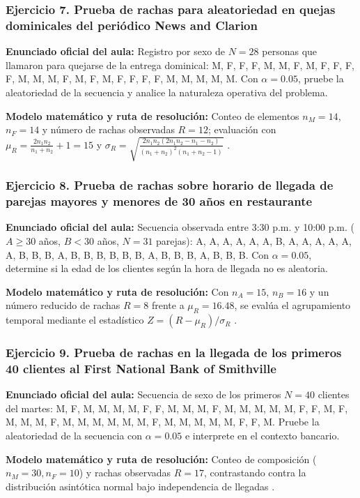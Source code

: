 {\subsubsection*{Ejercicio 7. Prueba de rachas para aleatoriedad en quejas dominicales del periódico News and Clarion}
\textbf{Enunciado oficial del aula:} Registro por sexo de $N = 28$ personas que llamaron para quejarse de la entrega dominical: M, F, F, F, M, M, F, M, F, F, F, F, M, M, M, F, M, F, M, F, F, F, F, M, M, M, M, M. Con $\alpha = 0.05$, pruebe la aleatoriedad de la secuencia y analice la naturaleza operativa del problema.

\textbf{Modelo matemático y ruta de resolución:} Conteo de elementos $n_M = 14$, $n_F = 14$ y número de rachas observadas $R = 12$; evaluación con $\mu_R = \frac{2 n_1 n_2}{n_1 + n_2} + 1 = 15$ y $\sigma_R = \sqrt{\frac{2n_1 n_2(2n_1 n_2 - n_1 - n_2)}{(n_1+n_2)^2(n_1+n_2-1)}}$ \citep{levin2004}.

\subsubsection*{Ejercicio 8. Prueba de rachas sobre horario de llegada de parejas mayores y menores de 30 años en restaurante}
\textbf{Enunciado oficial del aula:} Secuencia observada entre 3:30 p.m. y 10:00 p.m. ($A \ge 30$ años, $B < 30$ años, $N = 31$ parejas): A, A, A, A, A, A, B, A, A, A, A, A, A, B, B, B, A, B, B, B, B, B, B, A, B, B, B, A, B, B, B. Con $\alpha = 0.05$, determine si la edad de los clientes según la hora de llegada no es aleatoria.

\textbf{Modelo matemático y ruta de resolución:} Con $n_A = 15$, $n_B = 16$ y un número reducido de rachas $R = 8$ frente a $\mu_R = 16.48$, se evalúa el agrupamiento temporal mediante el estadístico $Z = (R - \mu_R)/\sigma_R$ \citep{levin2004}.

\subsubsection*{Ejercicio 9. Prueba de rachas en la llegada de los primeros 40 clientes al First National Bank of Smithville}
\textbf{Enunciado oficial del aula:} Secuencia de sexo de los primeros $N = 40$ clientes del martes: M, F, M, M, M, M, F, F, M, M, M, F, M, M, M, M, M, F, F, M, F, M, M, M, F, M, M, M, M, M, M, F, M, M, M, M, M, F, F, M. Pruebe la aleatoriedad de la secuencia con $\alpha = 0.05$ e interprete en el contexto bancario.

\textbf{Modelo matemático y ruta de resolución:} Conteo de composición ($n_M = 30, n_F = 10$) y rachas observadas $R = 17$, contrastando contra la distribución asintótica normal bajo independencia de llegadas \citep{levin2004}.

}
